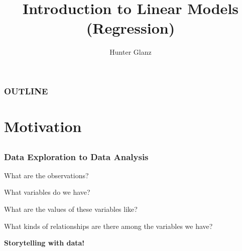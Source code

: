 

%



\title[]{Introduction to Linear Models \\
									(Regression)}
\author[Glanz]{Hunter Glanz}


\date{}




\begin{frame}
\titlepage
\end{frame}

\begin{frame}
\frametitle{OUTLINE\qquad\qquad\qquad} \tableofcontents[hideallsubsections]
\end{frame}


\section[Motivation]{Motivation}

\subsection{}

\begin{frame}
\frametitle{Data Exploration to Data Analysis}
\bi
	\item What are the observations?
	\item What variables do we have?
	\pause
	\item What are the values of these variables like?
	\pause
	\item What kinds of relationships are there among the variables we have?
	\pause
\ei
\begin{center}
	\textbf{Storytelling with data!}
\end{center}
\end{frame}

